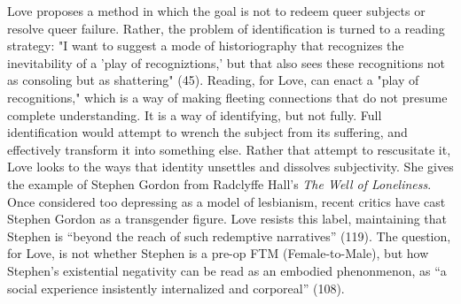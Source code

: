 \documentclass[11pt]{article}
\begin{document}
Love proposes a method in which the goal is not to redeem queer
subjects or resolve queer failure. Rather, the problem of
identification is turned to a reading strategy: "I want to suggest a
mode of historiography that recognizes the inevitability of a 'play of
recogniztions,' but that also sees these recognitions not as consoling
but as shattering" (45). Reading, for Love, can enact a "play of
recognitions," which is a way of making fleeting connections that do
not presume complete understanding. It is a way of identifying, but
not fully. Full identification would attempt to wrench the subject
from its suffering, and effectively transform it into something
else. Rather that attempt to rescusitate it, Love looks to the ways
that identity unsettles and dissolves subjectivity. She gives the
example of Stephen Gordon from Radclyffe Hall's \emph{The Well of
Loneliness}. Once considered too depressing as a model of lesbianism,
recent critics have cast Stephen Gordon as a transgender figure. Love
resists this label, maintaining that Stephen is “beyond the reach of
such redemptive narratives” (119). The question, for Love, is not
whether Stephen is a pre-op FTM (Female-to-Male), but how Stephen’s
existential negativity can be read as an embodied phenonmenon, as “a
social experience insistently internalized and corporeal” (108).
\end{document}
